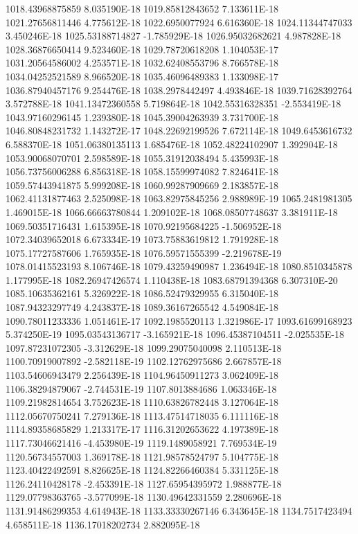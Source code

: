 1018.43968875859  8.035190E-18
1019.85812843652  7.133611E-18
1021.27656811446  4.775612E-18
1022.6950077924  6.616360E-18
1024.11344747033  3.450246E-18
1025.53188714827  -1.785929E-18
1026.95032682621  4.987828E-18
1028.36876650414  9.523460E-18
1029.78720618208  1.104053E-17
1031.20564586002  4.253571E-18
1032.62408553796  8.766578E-18
1034.04252521589  8.966520E-18
1035.46096489383  1.133098E-17
1036.87940457176  9.254476E-18
1038.2978442497  4.493846E-18
1039.71628392764  3.572788E-18
1041.13472360558  5.719864E-18
1042.55316328351  -2.553419E-18
1043.97160296145  1.239380E-18
1045.39004263939  3.731700E-18
1046.80848231732  1.143272E-17
1048.22692199526  7.672114E-18
1049.6453616732  6.588370E-18
1051.06380135113  1.685476E-18
1052.48224102907  1.392904E-18
1053.90068070701  2.598589E-18
1055.31912038494  5.435993E-18
1056.73756006288  6.856318E-18
1058.15599974082  7.824641E-18
1059.57443941875  5.999208E-18
1060.99287909669  2.183857E-18
1062.41131877463  2.525098E-18
1063.82975845256  2.988989E-19
1065.2481981305  1.469015E-18
1066.66663780844  1.209102E-18
1068.08507748637  3.381911E-18
1069.50351716431  1.615395E-18
1070.92195684225  -1.506952E-18
1072.34039652018  6.673334E-19
1073.75883619812  1.791928E-18
1075.17727587606  1.765935E-18
1076.59571555399  -2.219678E-19
1078.01415523193  8.106746E-18
1079.43259490987  1.236494E-18
1080.8510345878  1.177995E-18
1082.26947426574  1.110438E-18
1083.68791394368  6.307310E-20
1085.10635362161  5.326922E-18
1086.52479329955  6.315040E-18
1087.94323297749  4.243837E-18
1089.36167265542  4.549084E-18
1090.78011233336  1.051461E-17
1092.1985520113  1.321986E-17
1093.61699168923  5.374250E-19
1095.03543136717  -3.165921E-18
1096.45387104511  -2.025535E-18
1097.87231072305  -3.312629E-18
1099.29075040098  2.110513E-18
1100.70919007892  -2.582118E-19
1102.12762975686  2.667857E-18
1103.54606943479  2.256439E-18
1104.96450911273  3.062409E-18
1106.38294879067  -2.744531E-19
1107.8013884686  1.063346E-18
1109.21982814654  3.752623E-18
1110.63826782448  3.127064E-18
1112.05670750241  7.279136E-18
1113.47514718035  6.111116E-18
1114.89358685829  1.213317E-17
1116.31202653622  4.197389E-18
1117.73046621416  -4.453980E-19
1119.1489058921  7.769534E-19
1120.56734557003  1.369178E-18
1121.98578524797  5.104775E-18
1123.40422492591  8.826625E-18
1124.82266460384  5.331125E-18
1126.24110428178  -2.453391E-18
1127.65954395972  1.988877E-18
1129.07798363765  -3.577099E-18
1130.49642331559  2.280696E-18
1131.91486299353  4.614943E-18
1133.33330267146  6.343645E-18
1134.7517423494  4.658511E-18
1136.17018202734  2.882095E-18
